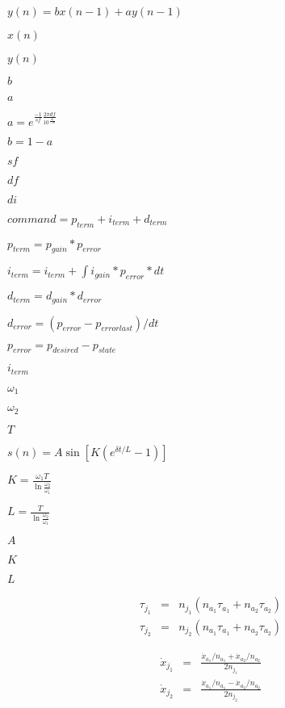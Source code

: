 \documentclass{article}
\begin{document}
$y(n) = b x(n-1) + a y(n-1)$
\pagebreak

$ x(n)$
\pagebreak

$ y(n)$
\pagebreak

$ b $
\pagebreak

$ a $
\pagebreak

$ a = e^{\frac{-1}{sf} \frac{2\pi df}{10^{\frac{di}{-10}}}} $
\pagebreak

$ b = 1 - a $
\pagebreak

$ sf $
\pagebreak

$ df $
\pagebreak

$ di $
\pagebreak

$command = p_{term} + i_{term} + d_{term} $
\pagebreak

$ p_{term} = p_{gain} * p_{error} $
\pagebreak

$ i_{term} = i_{term} + \int{i_{gain} * p_{error} * dt} $
\pagebreak

$ d_{term} = d_{gain} * d_{error} $
\pagebreak

$ d_{error} = (p_{error} - p_{error last}) / dt $
\pagebreak

$ p_{error} = p_{desired} - p_{state} $
\pagebreak

$i_{term}$
\pagebreak

$\omega_1$
\pagebreak

$\omega_2$
\pagebreak

$T$
\pagebreak

$s(n) = A \sin [ K(e^{\delta t/L} - 1) ]$
\pagebreak

$K = \frac{\omega_1T}{\ln \frac{\omega_2}{\omega_1} }$
\pagebreak

$L = \frac{T}{\ln \frac{\omega_2}{\omega_1} }$
\pagebreak

$A$
\pagebreak

$K$
\pagebreak

$L$
\pagebreak

\begin{eqnarray*} \tau_{j_1} & = & n_{j_1} ( n_{a_1} \tau_{a_1} + n_{a_2} \tau_{a_2} ) \\[2.5em] \tau_{j_2} & = & n_{j_2} ( n_{a_1} \tau_{a_1} + n_{a_2} \tau_{a_2} ) \end{eqnarray*}
\pagebreak

\begin{eqnarray*} \dot{x}_{j_1} & = & \frac{ \dot{x}_{a_1} / n_{a_1} + \dot{x}_{a_2} / n_{a_2} }{2 n_{j_1}} \\[1em] \dot{x}_{j_2} & = & \frac{ \dot{x}_{a_1} / n_{a_1} - \dot{x}_{a_2} / n_{a_2} }{2 n_{j_2}} \end{eqnarray*}
\pagebreak
\end{document}
